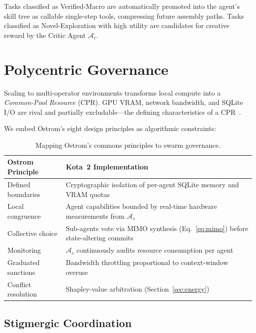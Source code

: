 \documentclass[11pt,a4paper]{article}
\begin{document}
\noindent Tasks classified as \textsf{Verified-Macro} are automatically promoted into the agent's skill tree as callable single-step tools, compressing future assembly paths. Tasks classified as \textsf{Novel-Exploration} with high utility are candidates for creative reward by the Critic Agent $\mathcal{A}_c$.

\section{Polycentric Governance}
\label{sec:governance}

Scaling to multi-operator environments transforms local compute into a \emph{Common-Pool Resource} (CPR). GPU VRAM, network bandwidth, and SQLite I/O are rival and partially excludable---the defining characteristics of a CPR~\citep{ostrom1990governing}.

We embed Ostrom's eight design principles as algorithmic constraints:

\begin{table}[h]
\centering
\small
\begin{tabular}{@{}lp{6cm}@{}}
\toprule
\textbf{Ostrom Principle} & \textbf{Kota~2 Implementation} \\
\midrule
Defined boundaries & Cryptographic isolation of per-agent SQLite memory and VRAM quotas \\
Local congruence & Agent capabilities bounded by real-time hardware measurements from $\mathcal{A}_s$ \\
Collective choice & Sub-agents vote via MIMO synthesis (Eq.~\ref{eq:mimo}) before state-altering commits \\
Monitoring & $\mathcal{A}_c$ continuously audits resource consumption per agent \\
Graduated sanctions & Bandwidth throttling proportional to context-window overuse \\
Conflict resolution & Shapley-value arbitration (Section~\ref{sec:energy}) \\
\bottomrule
\end{tabular}
\caption{Mapping Ostrom's commons principles to swarm governance.}
\label{tab:ostrom}
\end{table}

\subsection{Stigmergic Coordination}
\end{document}
